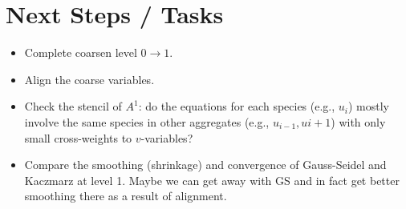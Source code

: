 \documentclass{article}
\begin{document}
\section{Next Steps / Tasks}
\begin{itemize}
    \item Complete coarsen level $0 \rightarrow 1$.
    \item Align the coarse variables.
    \item Check the stencil of $A^1$: do the equations for each species (e.g., $u_i$) mostly involve the same species in other aggregates (e.g., $u_{i-1},u{i+1}$) with only small cross-weights to $v$-variables?
    \item Compare the smoothing (shrinkage) and convergence of Gauss-Seidel and Kaczmarz at level 1. Maybe we can get away with GS and in fact get better smoothing there as a result of alignment.
\end{itemize}



\end{document}
